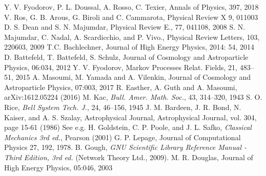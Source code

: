 \documentclass[12pt]{article}
\begin{document}
\begin{thebibliography}{99}
 Y. V. Fyodorov, P. L. Doussal, A. Rosso, C. Texier, Annals of Physics, 397, 2018
  V. Ros, G. B. Arous, G. Biroli and C. Cammarota, Physical Review X 9, 011003
 D. S. Dean and S. N. Majumdar, Physical Review E., 77, 041108, 2008
 S. N. Majumdar, C. Nadal, A. Scardicchio, and P. Vivo., Physical Review Letters, 103, 220603, 2009
 T.C. Bachlechner, Journal of High Energy Physics, 2014: 54, 2014
 D. Battefeld, T. Battefeld, S. Schulz, Journal of Cosmology and Astroparticle Physics, 06:034, 2012
 Y. V. Fyodorov, Markov Processes Relat. Fields, 21, 483--51, 2015
 A. Masoumi, M. Yamada and A. Vilenkin, Journal of Cosmology and Astroparticle Physics, 07:003, 2017
 R. Easther, A. Guth and A. Masoumi, arXiv:1612.05224 (2016)
 M. Kac, \emph{Bull. Amer. Math. Soc.}, 43, 314–320, 1943
  S. O. Rice, \emph{Bell System Tech. J.}, 24, 46--156, 1945
 J. M. Bardeen, J. R. Bond, N. Kaiser, and A. S. Szalay, Astrophysical Journal, Astrophysical Journal, vol. 304, page 15-61 (1986)
 See e.g. H. Goldstein, C. P. Poole, and J. L. Safko, \emph{Classical Mechanics 3rd ed.}, Pearson (2001)
 G. P. Lepage, Journal of Computational Physics 27, 192, 1978.
 B. Gough, \emph{GNU Scientific Library Reference Manual - Third Edition, 3rd ed.} (Network Theory Ltd., 2009).
 M. R. Douglas, Journal of High Energy Physics, 05:046, 2003
\end{thebibliography}
\end{document}
